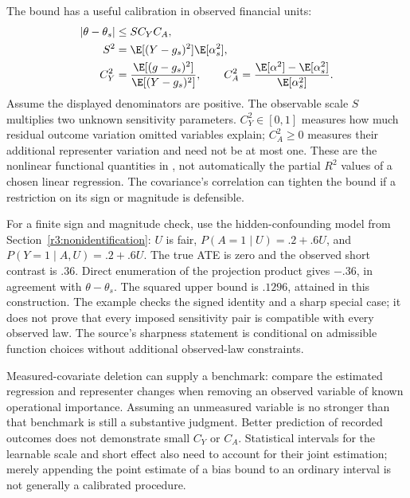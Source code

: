 The bound has a useful calibration in observed financial units:
\begin{align}
 |\theta-\theta_s|&\le S C_Y C_A,\nonumber\\
 S^2&=\E[(Y-g_s)^2]\E[\alpha_s^2],\nonumber\\
 C_Y^2&=\frac{\E[(g-g_s)^2]}{\E[(Y-g_s)^2]},\qquad
 C_A^2=\frac{\E[\alpha^2]-\E[\alpha_s^2]}{\E[\alpha_s^2]}.
 \label{r3:ovb-calibration}
\end{align}
Assume the displayed denominators are positive. The observable scale
$S$ multiplies two unknown sensitivity parameters. $C_Y^2\in[0,1]$
measures how much residual outcome variation omitted variables explain;
$C_A^2\ge0$ measures their additional representer variation and
need not be at most one. These are the nonlinear functional quantities
in \citet[Corollary 2]{ovb2022}, not automatically the partial
$R^2$ values of a chosen linear regression. The covariance's
correlation can tighten the bound if a restriction on its sign or
magnitude is defensible.

For a finite sign and magnitude check, use the hidden-confounding
model from Section~\ref{r3:nonidentification}: $U$ is fair,
$P(A=1\mid U)=.2+.6U$, and $P(Y=1\mid A,U)=.2+.6U$.
The true ATE is zero and the observed short contrast is $.36$.
Direct enumeration of the projection product gives $-.36$, in
agreement with $\theta-\theta_s$. The squared upper bound is
$.1296$, attained in this construction. The example checks the
signed identity and a sharp special case; it does not prove that
every imposed sensitivity pair is compatible with every observed law.
The source's sharpness statement is conditional on admissible
function choices without additional observed-law constraints.

Measured-covariate deletion can supply a benchmark: compare the
estimated regression and representer changes when removing an
observed variable of known operational importance. Assuming an
unmeasured variable is no stronger than that benchmark is still a
substantive judgment. Better prediction of recorded outcomes does
not demonstrate small $C_Y$ or $C_A$. Statistical intervals for
the learnable scale and short effect also need to account for their
joint estimation; merely appending the point estimate of a bias
bound to an ordinary interval is not generally a calibrated procedure.

